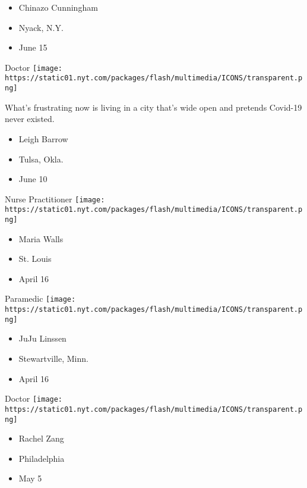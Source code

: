 \begin{itemize}
\tightlist
\item
  Chinazo Cunningham
\item
  Nyack, N.Y.
\item
  June 15
\end{itemize}

\protect\hyperlink{item-leigh-barrow}{}

Doctor
\texttt{[image: https://static01.nyt.com/packages/flash/multimedia/ICONS/transparent.png]}

What's frustrating now is living in a city that's wide open and pretends
Covid-19 never existed.

\begin{itemize}
\tightlist
\item
  Leigh Barrow
\item
  Tulsa, Okla.
\item
  June 10
\end{itemize}

\protect\hyperlink{item-maria-walls}{}

Nurse Practitioner
\texttt{[image: https://static01.nyt.com/packages/flash/multimedia/ICONS/transparent.png]}

\begin{itemize}
\tightlist
\item
  Maria Walls
\item
  St. Louis
\item
  April 16
\end{itemize}

\protect\hyperlink{item-juju-linssen}{}

Paramedic
\texttt{[image: https://static01.nyt.com/packages/flash/multimedia/ICONS/transparent.png]}

\begin{itemize}
\tightlist
\item
  JuJu Linssen
\item
  Stewartville, Minn.
\item
  April 16
\end{itemize}

\protect\hyperlink{item-rachel-zang}{}

Doctor
\texttt{[image: https://static01.nyt.com/packages/flash/multimedia/ICONS/transparent.png]}

\begin{itemize}
\tightlist
\item
  Rachel Zang
\item
  Philadelphia
\item
  May 5
\end{itemize}

